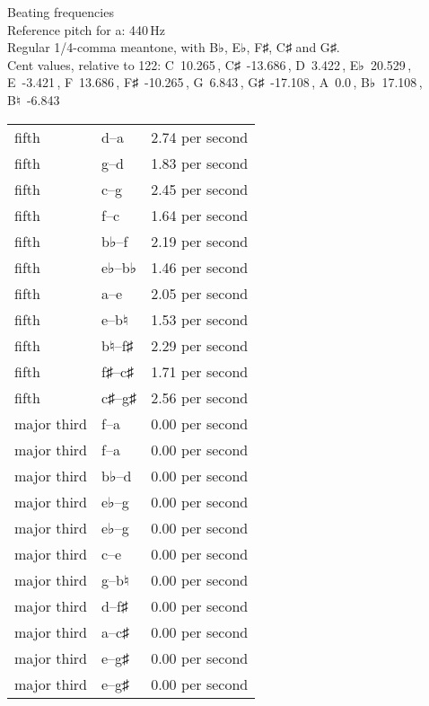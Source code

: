 \documentclass{standalone}
\def\str{\textquotesingle}
\def\cn{\textcent}
\begin{document}
\begin{minipage}{8cm}
\begin{center}
  {\Large Beating frequencies}\\[2ex]
  Reference pitch for a\str: 440\,Hz\\[1ex]
  Regular 1/4-comma meantone, with B♭, E♭, F♯, C♯ and G♯.\\[1ex]
  Cent values, relative to 122: C~10.265\,\cn, C♯~-13.686\,\cn, D~3.422\,\cn, E♭~20.529\,\cn, E~-3.421\,\cn, F~13.686\,\cn, F♯~-10.265\,\cn, G~6.843\,\cn, G♯~-17.108\,\cn, A~0.0\,\cn, B♭~17.108\,\cn, B♮~-6.843\,\cn
\end{center}
\begin{longtable}{p{2cm}p{1cm}p{3cm}}
  \toprule
  fifth & d\str--a\str & 2.74 per second \\fifth & g--d\str & 1.83 per second \\fifth & c\str--g\str & 2.45 per second \\fifth & f--c\str & 1.64 per second \\fifth & b♭--f\str & 2.19 per second \\fifth & e♭--b♭ & 1.46 per second \\fifth & a--e\str & 2.05 per second \\fifth & e--b♮ & 1.53 per second \\fifth & b♮--f♯\str & 2.29 per second \\fifth & f♯--c♯\str & 1.71 per second \\fifth & c♯\str--g♯\str & 2.56 per second \\major third & f\str--a\str & 0.00 per second \\major third & f--a & 0.00 per second \\major third & b♭--d\str & 0.00 per second \\major third & e♭--g & 0.00 per second \\major third & e♭\str--g\str & 0.00 per second \\major third & c\str--e\str & 0.00 per second \\major third & g--b♮ & 0.00 per second \\major third & d\str--f♯\str & 0.00 per second \\major third & a--c♯\str & 0.00 per second \\major third & e\str--g♯\str & 0.00 per second \\major third & e--g♯ & 0.00 per second \\
  \bottomrule
\end{longtable}
\end{minipage}
\end{document}
